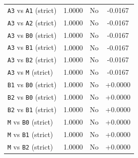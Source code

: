 \begin{longtable}{lccc}
\texttt{A3} vs \texttt{A1} (strict) & 1.0000 & No & -0.0167 \\
\texttt{A3} vs \texttt{A2} (strict) & 1.0000 & No & -0.0167 \\
\texttt{A3} vs \texttt{B0} (strict) & 1.0000 & No & -0.0167 \\
\texttt{A3} vs \texttt{B1} (strict) & 1.0000 & No & -0.0167 \\
\texttt{A3} vs \texttt{B2} (strict) & 1.0000 & No & -0.0167 \\
\texttt{A3} vs \texttt{M} (strict) & 1.0000 & No & -0.0167 \\
\texttt{B1} vs \texttt{B0} (strict) & 1.0000 & No & +0.0000 \\
\texttt{B2} vs \texttt{B0} (strict) & 1.0000 & No & +0.0000 \\
\texttt{B2} vs \texttt{B1} (strict) & 1.0000 & No & +0.0000 \\
\texttt{M} vs \texttt{B0} (strict) & 1.0000 & No & +0.0000 \\
\texttt{M} vs \texttt{B1} (strict) & 1.0000 & No & +0.0000 \\
\texttt{M} vs \texttt{B2} (strict) & 1.0000 & No & +0.0000 \\
\end{longtable}
\normalsize
